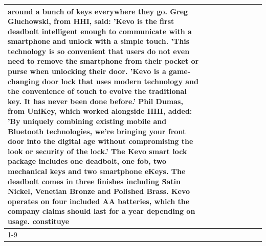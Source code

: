 \begin{table}[H]
\begin{tabular}{lllrlllll}
around a bunch of keys everywhere they go. Greg Gluchowski, from HHI, said: 'Kevo is the first deadbolt intelligent enough to communicate with a smartphone and unlock with a simple touch. 'This technology is so convenient that users do not even need to remove the smartphone from their pocket or purse when unlocking their door. 'Kevo is a game-changing door lock that uses modern technology and the convenience of touch to evolve the traditional key. It has never been done before.' Phil Dumas, from UniKey, which worked alongside HHI, added: 'By uniquely combining existing mobile and Bluetooth technologies, we’re bringing your front door into the digital age without compromising the look or security of the lock.' The Kevo smart lock package includes one deadbolt, one fob, two mechanical keys and two smartphone eKeys. The deadbolt comes in three finishes including Satin Nickel, Venetian Bronze and Polished Brass. Kevo operates on four included AA batteries, which the company claims should last for a year depending on usage. constituye \\
\cline{1-9}

\end{tabular}
\end{table}
